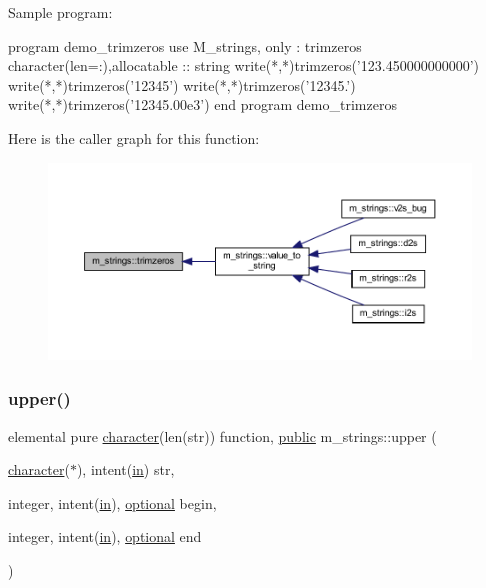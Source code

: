 \begin{DoxyVerb}Sample program:

   program demo_trimzeros
   use M_strings, only : trimzeros
   character(len=:),allocatable :: string
   write(*,*)trimzeros('123.450000000000')
   write(*,*)trimzeros('12345')
   write(*,*)trimzeros('12345.')
   write(*,*)trimzeros('12345.00e3')
   end program demo_trimzeros \end{DoxyVerb}
 Here is the caller graph for this function\+:
\nopagebreak
\begin{figure}[H]
\begin{center}
\leavevmode
\includegraphics[width=350pt]{namespacem__strings_a956638e87e83520f170ccefefac6722b_icgraph}
\end{center}
\end{figure}
\mbox{\label{namespacem__strings_a0953ac5c4d31339fdd8ec3acc9c3c915}} 
\subsubsection{\texorpdfstring{upper()}{upper()}}
{\footnotesize\ttfamily elemental pure \hyperlink{option__stopwatch_83_8txt_abd4b21fbbd175834027b5224bfe97e66}{character}(len(str)) function, \hyperlink{M__stopwatch_83_8txt_a2f74811300c361e53b430611a7d1769f}{public} m\+\_\+strings\+::upper (\begin{DoxyParamCaption}\item[{\hyperlink{option__stopwatch_83_8txt_abd4b21fbbd175834027b5224bfe97e66}{character}($\ast$), intent(\hyperlink{M__journal_83_8txt_afce72651d1eed785a2132bee863b2f38}{in})}]{str,  }\item[{integer, intent(\hyperlink{M__journal_83_8txt_afce72651d1eed785a2132bee863b2f38}{in}), \hyperlink{option__stopwatch_83_8txt_aa4ece75e7acf58a4843f70fe18c3ade5}{optional}}]{begin,  }\item[{integer, intent(\hyperlink{M__journal_83_8txt_afce72651d1eed785a2132bee863b2f38}{in}), \hyperlink{option__stopwatch_83_8txt_aa4ece75e7acf58a4843f70fe18c3ade5}{optional}}]{end }\end{DoxyParamCaption})}



